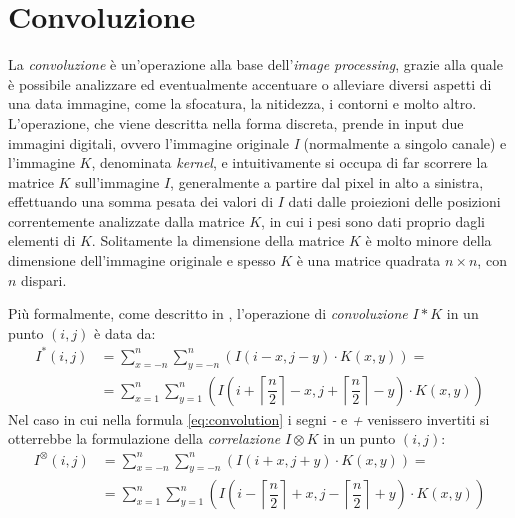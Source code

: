 \section{Convoluzione}
\label{sec:math-convolution}
La \textit{convoluzione} \`e un'operazione alla base dell'\textit{image processing}, grazie alla quale \`e possibile analizzare ed eventualmente accentuare o alleviare diversi aspetti di una data immagine, come la sfocatura, la nitidezza, i contorni e molto altro. L'operazione, che viene descritta nella forma discreta, prende in input due immagini digitali, ovvero l'immagine originale \textit{I} (normalmente a singolo canale) e l'immagine $K$, denominata \textit{kernel}, e intuitivamente si occupa di far scorrere la matrice $K$ sull'immagine $I$, generalmente a partire dal pixel in alto a sinistra, effettuando una somma pesata dei valori di $I$ dati dalle proiezioni delle posizioni correntemente analizzate dalla matrice $K$, in cui i pesi sono dati proprio dagli elementi di $K$. Solitamente la dimensione della matrice $K$ \`e molto minore della dimensione dell'immagine originale e spesso $K$ \`e una matrice quadrata $n\times n$, con $n$ dispari.\par
Pi\`u formalmente, come descritto in \cite{bib:convolution}, l'operazione di \textit{convoluzione} $I * K$ in un punto $(i,j)$ \`e data da:
\begin{equation}
	\label{eq:convolution}
	\begin{split}
		I^{*}(i, j) & = \sum_{x = -n}^{n}\sum_{y = -n}^{n}(I(i-x, j-y)\cdot K(x,y))=\\
		& = \sum_{x = 1}^{n}\sum_{y = 1}^{n}(I(i + \left\lceil{\dfrac{n}{2}}\right\rceil - x, j + \left\lceil{\dfrac{n}{2}}\right\rceil - y)\cdot K(x,y))
	\end{split}
\end{equation}
Nel caso in cui nella formula \ref{eq:convolution} i segni \textit{-} e \textit{+} venissero invertiti si otterrebbe la formulazione della \textit{correlazione} $I \otimes K$ in un punto $(i,j)$:
\begin{equation}
	\label{eq:correlation}
	\begin{split}
		I^{\otimes}(i, j) & = \sum_{x = -n}^{n}\sum_{y = -n}^{n}(I(i+x, j+y)\cdot K(x,y))=\\
		& = \sum_{x = 1}^{n}\sum_{y = 1}^{n}(I(i - \left\lceil{\dfrac{n}{2}}\right\rceil + x, j - \left\lceil{\dfrac{n}{2}}\right\rceil + y)\cdot K(x,y))
	\end{split}
\end{equation}\par
